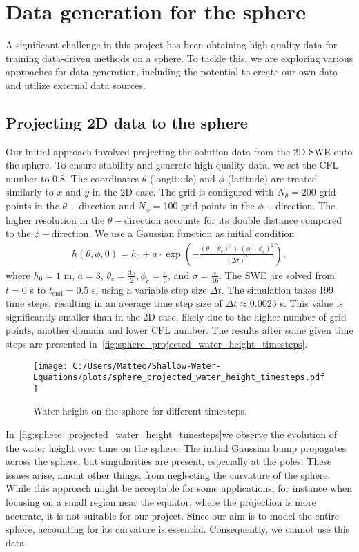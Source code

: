 \section{Data generation for the sphere}
A significant challenge in this project has been obtaining high-quality data for training data-driven methods on a sphere.
To tackle this, we are exploring various approaches for data generation, including the potential to create our own data and utilize external data sources.


\subsection*{Projecting 2D data to the sphere}
Our initial approach involved projecting the solution data from the 2D SWE onto the sphere.
To ensure stability and generate high-quality data, we set the CFL number to 0.8.
The coordinates $\theta$ (longitude) and $\phi$ (latitude) are treated similarly to $x$ and $y$ in the 2D case.
The grid is configured with $N_{\theta} = 200$ grid points in the $\theta-$direction and $N_{\phi} = 100$ grid points in the $\phi-$direction.
The higher resolution in the $\theta-$direction accounts for its double distance compared to the $\phi-$direction.
We use a Gaussian function as initial condition
\begin{align*}
    h(\theta, \phi, 0) = h_0 + a \cdot \exp\left( -\frac{{(\theta - \theta_c)}^2 + {(\phi - \phi_c)}^2}{{(2\sigma)}^2} \right),
\end{align*}
where $h_0 = 1$ m, $a = 3$, $\theta_c = \frac{3 \pi}{2}, \phi_c = \frac{\pi}{3}$, and $\sigma = \frac{\pi}{16}$.
The SWE are solved from $t = 0$ s to $t_{\text{end}} = 0.5$ s, using a variable step size $\Delta t$.
The simulation takes 199 time steps, resulting in an average time step size of $\Delta t \approx 0.0025$ s.
This value is significantly smaller than in the 2D case, likely due to the higher number of grid points, another domain and lower CFL number.
The results after some given time steps are presented in~\autoref{fig:sphere_projected_water_height_timesteps}.
\begin{figure}[H]
    \centering
    \texttt{[image: C:/Users/Matteo/Shallow-Water-Equations/plots/sphere\_projected\_water\_height\_timesteps.pdf]}
    \caption{Water height on the sphere for different timesteps.}\label{fig:sphere_projected_water_height_timesteps}
\end{figure}
In~\autoref{fig:sphere_projected_water_height_timesteps}we observe the evolution of the water height over time on the sphere.
The initial Gaussian bump propagates across the sphere, but singularities are present, especially at the poles.
These issues arise, amont other things, from neglecting the curvature of the sphere. 
While this approach might be acceptable for some applications, for instance when focusing on a small region near the equator, where the projection is more accurate, it is not suitable for our project.
Since our aim is to model the entire sphere, accounting for its curvature is essential.
Consequently, we cannot use this data.

